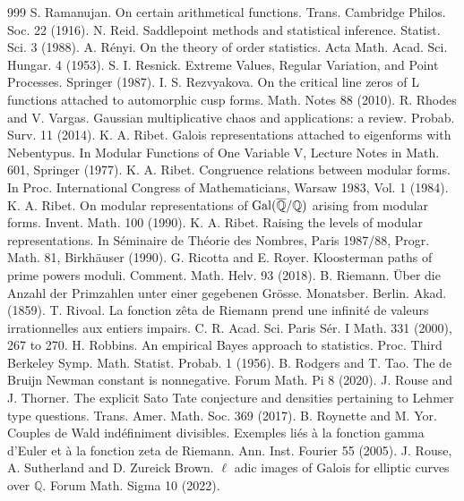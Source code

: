 \begin{thebibliography}{999}
 S. Ramanujan. On certain arithmetical functions. Trans. Cambridge Philos. Soc. 22 (1916).
 N. Reid. Saddlepoint methods and statistical inference. Statist. Sci. 3 (1988).
 A. R\'enyi. On the theory of order statistics. Acta Math. Acad. Sci. Hungar. 4 (1953).
 S. I. Resnick. Extreme Values, Regular Variation, and Point Processes. Springer (1987).
 I. S. Rezvyakova. On the critical line zeros of L functions attached to automorphic cusp forms. Math. Notes 88 (2010).
 R. Rhodes and V. Vargas. Gaussian multiplicative chaos and applications: a review. Probab. Surv. 11 (2014).
 K. A. Ribet. Galois representations attached to eigenforms with Nebentypus. In Modular Functions of One Variable V, Lecture Notes in Math. 601, Springer (1977).
 K. A. Ribet. Congruence relations between modular forms. In Proc. International Congress of Mathematicians, Warsaw 1983, Vol. 1 (1984).
 K. A. Ribet. On modular representations of $\operatorname{Gal}(\overline{\mathbb{Q}}/\mathbb{Q})$ arising from modular forms. Invent. Math. 100 (1990).
 K. A. Ribet. Raising the levels of modular representations. In S\'eminaire de Th\'eorie des Nombres, Paris 1987/88, Progr. Math. 81, Birkh\"auser (1990).
 G. Ricotta and E. Royer. Kloosterman paths of prime powers moduli. Comment. Math. Helv. 93 (2018).
 B. Riemann. \"Uber die Anzahl der Primzahlen unter einer gegebenen Gr\"osse. Monatsber. Berlin. Akad. (1859).
 T. Rivoal. La fonction z\^eta de Riemann prend une infinit\'e de valeurs irrationnelles aux entiers impairs. C. R. Acad. Sci. Paris S\'er. I Math. 331 (2000), 267 to 270.
 H. Robbins. An empirical Bayes approach to statistics. Proc. Third Berkeley Symp. Math. Statist. Probab. 1 (1956).
 B. Rodgers and T. Tao. The de Bruijn Newman constant is nonnegative. Forum Math. Pi 8 (2020).
 J. Rouse and J. Thorner. The explicit Sato Tate conjecture and densities pertaining to Lehmer type questions. Trans. Amer. Math. Soc. 369 (2017).
 B. Roynette and M. Yor. Couples de Wald ind\'efiniment divisibles. Exemples li\'es \`a la fonction gamma d'Euler et \`a la fonction zeta de Riemann. Ann. Inst. Fourier 55 (2005).
 J. Rouse, A. Sutherland and D. Zureick Brown. $\ell$ adic images of Galois for elliptic curves over $\mathbb{Q}$. Forum Math. Sigma 10 (2022).

\end{thebibliography}
